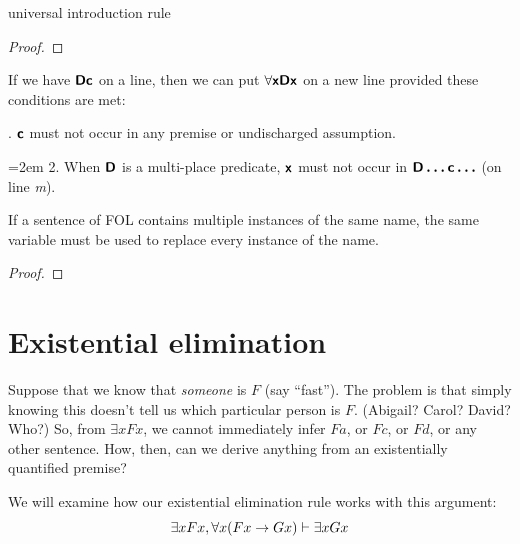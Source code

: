 \begin{factboxy}{universal introduction rule}
\begin{proof}
	 
\end{proof}

\small{If we have $\bm{\mathsf{Dc}}$ on a line, then we can put $\forall \bm{\mathsf{xDx}}$ on a new line provided these conditions are met:

. $\bm{\mathsf{c}}$ must not occur in any premise or undischarged assumption.

\noindent \hangindent=2em  2. When $\bm{\mathsf{D}}$ is a multi-place predicate, $\bm{\mathsf{x}}$ must not occur in $\bm{\mathsf{D\ldots c\ldots}}$ (on line \textit{m}).
\smallskip

If a sentence of FOL contains multiple instances of the same name, the same variable must be used to replace every instance of the name.}

\begin{proof}
	 
\end{proof}
\end{factboxy}



\section{Existential elimination}

Suppose that we know that \emph{someone} is $F$ (say ``fast''). The problem is that simply knowing this doesn't tell us which particular person is $F$. (Abigail? Carol? David? Who?) So, from $\exists x Fx$, we cannot immediately infer $Fa$, or $Fc$, or $Fd$,  or any other sentence. How, then, can we derive anything from an existentially quantified premise?

We will examine how our existential elimination rule works with this argument:
$$\exists x Fx, \forall x(Fx \rightarrow Gx) \vdash \exists x Gx$$


